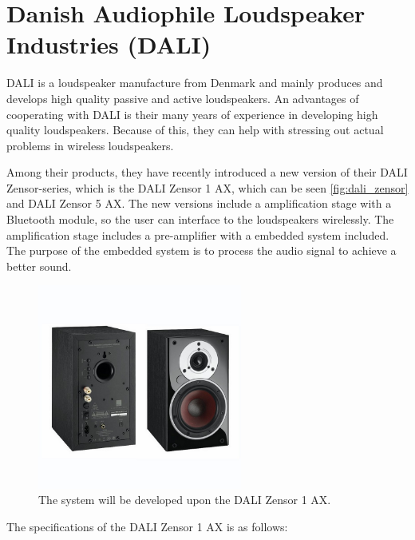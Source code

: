 \chapter{Danish Audiophile Loudspeaker Industries (DALI)} \label{app:dali}
DALI is a loudspeaker manufacture from Denmark and mainly produces and develops high quality passive and active loudspeakers. An advantages of cooperating with DALI is their many years of experience in developing high quality loudspeakers. Because of this, they can help with stressing out actual problems in wireless loudspeakers.

Among their products, they have recently introduced a new version of their DALI Zensor-series, which is the DALI Zensor 1 AX, which can be seen \autoref{fig:dali_zensor} and DALI Zensor 5 AX. The  new versions include a amplification stage with a Bluetooth module, so the user can interface to the loudspeakers wirelessly. The amplification stage includes a pre-amplifier with a embedded system included. The purpose of the embedded system is to process the audio signal to achieve a better sound.

\begin{figure}[H]
\centering
\includegraphics[width=0.6\textwidth]{figures/dali_zensor_1_ax.jpg}
\caption{The system will be developed upon the DALI Zensor 1 AX.}
\label{fig:dali_zensor}
\end{figure}

The specifications of the DALI Zensor 1 AX is as follows:

